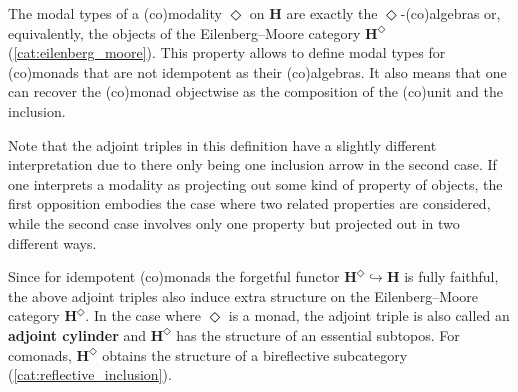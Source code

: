     \begin{property}
        The modal types of a (co)modality $\Diamond$ on $\mathbf{H}$ are exactly the $\Diamond$-(co)algebras or, equivalently, the objects of the Eilenberg--Moore category $\mathbf{H}^\Diamond$ (\cref{cat:eilenberg_moore}). This property allows to define modal types for (co)monads that are not idempotent as their (co)algebras. It also means that one can recover the (co)monad objectwise as the composition of the (co)unit and the inclusion.
    \end{property}

    \begin{remark}[Interpretation]
        Note that the adjoint triples in this definition have a slightly different interpretation due to there only being one inclusion arrow in the second case. If one interprets a modality as projecting out some kind of property of objects, the first opposition embodies the case where two related properties are considered, while the second case involves only one property but projected out in two different ways.
    \end{remark}

    \begin{property}
        Since for idempotent (co)monads the forgetful functor $\mathbf{H}^\Diamond\hookrightarrow\mathbf{H}$ is fully faithful, the above adjoint triples also induce extra structure on the Eilenberg--Moore category $\mathbf{H}^\Diamond$. In the case where $\Diamond$ is a monad, the adjoint triple is also called an \textbf{adjoint cylinder} and $\mathbf{H}^\Diamond$ has the structure of an essential subtopos. For comonads, $\mathbf{H}^\Diamond$ obtains the structure of a bireflective subcategory (\cref{cat:reflective_inclusion}).
    \end{property}

